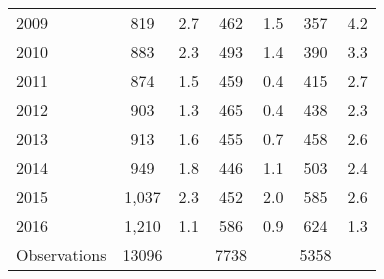 \begin{table}[htbp]
\begin{tabular}{l*{3}{cc}}
2009                &         819&         2.7&         462&         1.5&         357&         4.2\\
2010                &         883&         2.3&         493&         1.4&         390&         3.3\\
2011                &         874&         1.5&         459&         0.4&         415&         2.7\\
2012                &         903&         1.3&         465&         0.4&         438&         2.3\\
2013                &         913&         1.6&         455&         0.7&         458&         2.6\\
2014                &         949&         1.8&         446&         1.1&         503&         2.4\\
2015                &       1,037&         2.3&         452&         2.0&         585&         2.6\\
2016                &       1,210&         1.1&         586&         0.9&         624&         1.3\\
\hline
Observations        &       13096&            &        7738&            &        5358&            \\
\hline\hline
\end{tabular}
\end{table}

